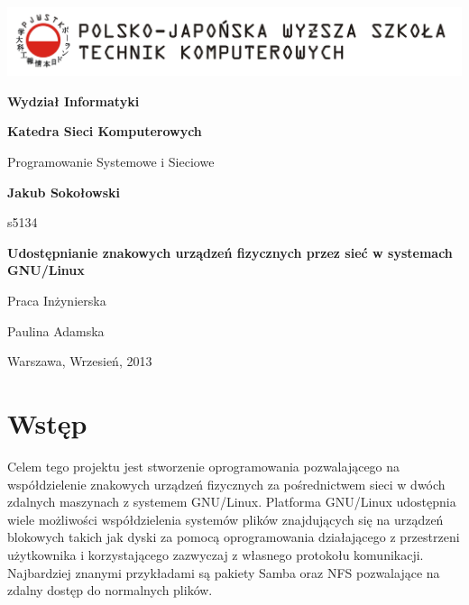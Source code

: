 \documentclass[11pt]{scrartcl}
\let\stdsection\section
\renewcommand\section{\newpage\stdsection}
\begin{document}
\begin{titlepage}
    \begin{center}
        \includegraphics[width=\linewidth]{pjwstk}

        \vspace*{1cm}
        \begin{large}
        \textbf{Wydział Informatyki}

        \vspace*{2cm}
        \textbf{Katedra Sieci Komputerowych}

        \vspace*{0.5cm}
        Programowanie Systemowe i Sieciowe

        \vspace*{2.5cm}
        \textbf{Jakub Sokołowski}

        s5134

        \vspace*{1cm}
        \textbf{Udostępnianie znakowych urządzeń fizycznych przez sieć w systemach GNU/Linux}

        \begin{flushright}
            \vspace*{2cm}
            Praca Inżynierska

            Paulina Adamska
        \end{flushright}

        \vfill
        Warszawa, Wrzesień, 2013
        \end{large}
    \end{center}
\end{titlepage}

\tableofcontents

\newpage
\section{Wstęp}
\label{abstract}

Celem tego projektu jest stworzenie oprogramowania pozwalającego na współdzielenie znakowych urządzeń fizycznych za pośrednictwem sieci w dwóch zdalnych maszynach z systemem GNU/Linux. Platforma GNU/Linux udostępnia wiele możliwości współdzielenia systemów plików znajdujących się na urządzeń blokowych takich jak dyski za pomocą oprogramowania działającego z przestrzeni użytkownika i korzystającego zazwyczaj z własnego protokołu komunikacji. Najbardziej znanymi przykładami są pakiety Samba oraz NFS pozwalające na zdalny dostęp do normalnych plików.
\end{document}
